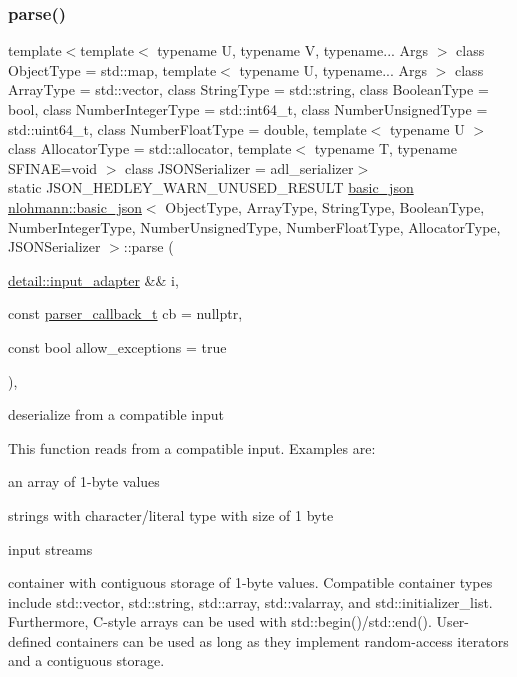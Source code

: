 \subsubsection{\texorpdfstring{parse()}{parse()}\hspace{0.1cm}{\footnotesize\ttfamily [1/2]}}
{\footnotesize\ttfamily template$<$template$<$ typename U, typename V, typename... Args $>$ class Object\+Type = std\+::map, template$<$ typename U, typename... Args $>$ class Array\+Type = std\+::vector, class String\+Type  = std\+::string, class Boolean\+Type  = bool, class Number\+Integer\+Type  = std\+::int64\+\_\+t, class Number\+Unsigned\+Type  = std\+::uint64\+\_\+t, class Number\+Float\+Type  = double, template$<$ typename U $>$ class Allocator\+Type = std\+::allocator, template$<$ typename T, typename S\+F\+I\+N\+A\+E=void $>$ class J\+S\+O\+N\+Serializer = adl\+\_\+serializer$>$ \\
static J\+S\+O\+N\+\_\+\+H\+E\+D\+L\+E\+Y\+\_\+\+W\+A\+R\+N\+\_\+\+U\+N\+U\+S\+E\+D\+\_\+\+R\+E\+S\+U\+LT \mbox{\hyperlink{classnlohmann_1_1basic__json}{basic\+\_\+json}} \mbox{\hyperlink{classnlohmann_1_1basic__json}{nlohmann\+::basic\+\_\+json}}$<$ Object\+Type, Array\+Type, String\+Type, Boolean\+Type, Number\+Integer\+Type, Number\+Unsigned\+Type, Number\+Float\+Type, Allocator\+Type, J\+S\+O\+N\+Serializer $>$\+::parse (\begin{DoxyParamCaption}\item[{\mbox{\hyperlink{classnlohmann_1_1detail_1_1input__adapter}{detail\+::input\+\_\+adapter}} \&\&}]{i,  }\item[{const \mbox{\hyperlink{classnlohmann_1_1basic__json_ab4f78c5f9fd25172eeec84482e03f5b7}{parser\+\_\+callback\+\_\+t}}}]{cb = {\ttfamily nullptr},  }\item[{const bool}]{allow\+\_\+exceptions = {\ttfamily true} }\end{DoxyParamCaption})\hspace{0.3cm}{\ttfamily [inline]}, {\ttfamily [static]}}



deserialize from a compatible input 

This function reads from a compatible input. Examples are\+:
\begin{DoxyItemize}
\item an array of 1-\/byte values
\item strings with character/literal type with size of 1 byte
\item input streams
\item container with contiguous storage of 1-\/byte values. Compatible container types include {\ttfamily std\+::vector}, {\ttfamily std\+::string}, {\ttfamily std\+::array}, {\ttfamily std\+::valarray}, and {\ttfamily std\+::initializer\+\_\+list}. Furthermore, C-\/style arrays can be used with {\ttfamily std\+::begin()}/{\ttfamily std\+::end()}. User-\/defined containers can be used as long as they implement random-\/access iterators and a contiguous storage.
\end{DoxyItemize}

